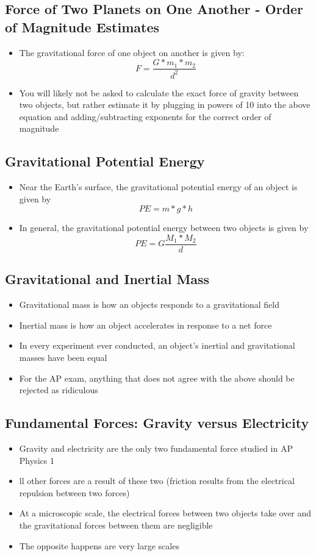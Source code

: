 \subsection{Force of Two Planets on One Another - Order of Magnitude Estimates}
\begin{itemize}
    \item The gravitational force of one object on another is given by: \[F=\frac{G*m_1*m_2}{d^2}\]
    \item You will likely not be asked to calculate the exact force of gravity between two objects, but rather estimate it by plugging in powers of 10 into the above equation and adding/subtracting exponents for the correct order of magnitude
\end{itemize}

\subsection{Gravitational Potential Energy}
\begin{itemize}
    \item Near the Earth's surface, the gravitational potential energy of an object is given by \[PE=m*g*h\]
    \item In general, the gravitational potential energy between two objects is given by \[PE=G\frac{M_1*M_2}{d}\]
\end{itemize}

\subsection{Gravitational and Inertial Mass}
\begin{itemize}
    \item Gravitational mass is how an objects responds to a gravitational field
    \item Inertial mass is how an object accelerates in response to a net force
    \item In every experiment ever conducted, an object's inertial and gravitational masses have been equal
    \item For the AP exam, anything that does not agree with the above should be rejected as ridiculous
\end{itemize}

\subsection{Fundamental Forces: Gravity versus Electricity}
\begin{itemize}
    \item Gravity and electricity are the only two fundamental force studied in AP Physics 1
    \item ll other forces are a result of these two (friction results from the electrical repulsion between two forces)
    \item At a microscopic scale, the electrical forces between two objects take over and the gravitational forces between them are negligible
    \item The opposite happens are very large scales
\end{itemize}